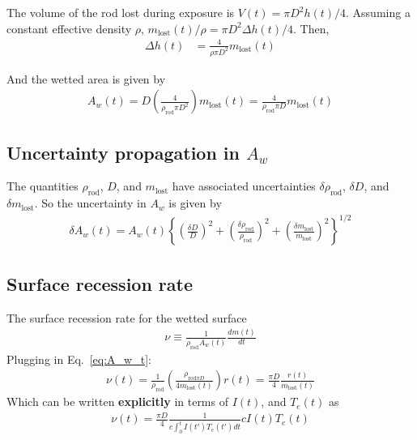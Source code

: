 \documentclass[11pt,twoside]{article}
\begin{document}
The volume of the rod lost during exposure is $V(t) = \pi D^2 h(t) / 4$. Assuming a constant effective density $\rho$, $m_{\mathrm{lost}}(t)/\rho = \pi D^2 \Delta h(t) / 4$. Then,
\begin{align*}
    \Delta h(t) &= \frac{4}{\rho\pi D^2} m_{\mathrm{lost}}(t)
\end{align*}

And the wetted area is given by
\begin{align}
    A_w(t) = D\left( \frac{4}{\rho_{\mathrm{rod}}\pi D^2}\right) m_{\mathrm{lost}}(t) 
    = \frac{4}{\rho_{\mathrm{rod}}\pi D} m_{\mathrm{lost}} (t) 
    \label{eq:A_w_t}
\end{align}

\subsection{Uncertainty propagation in $A_w$}
The quantities $\rho_{\mathrm{rod}}$, $D$, and $m_{\mathrm{lost}}$ have associated uncertainties $\delta \rho_{\mathrm{rod}}$, $\delta D$, and $\delta m_{\mathrm{lost}}$. So the uncertainty in $A_w$ is given by
\begin{align}
    \delta A_w (t) = A_w(t) \left\{ 
        \left(\frac{\delta D}{D}\right)^2 
        +
        \left(\frac{\delta \rho_{\mathrm{rod}}}{\rho_{\mathrm{rod}}}\right)^2 
        + 
        \left(\frac{\delta m_{\mathrm{lost}}}{m_{\mathrm{lost}}}\right)^2
    \right\}^{1/2}
\end{align}

\subsection{Surface recession rate}
The surface recession rate for the wetted surface 
\begin{align}
    \nu \equiv \frac{1}{\rho_{\mathrm{rod}} A_w(t)} \frac{dm(t)}{dt} 
\end{align}
Plugging in Eq.~\eqref{eq:A_w_t}:
\begin{align*}
    \nu(t) = \frac{1}{\rho_{\mathrm{rod}}} \left( \frac{\rho_{\mathrm{rod} \pi D}}{4 m_{\mathrm{lost}}(t)}\right) r(t)
    = \frac{\pi D}{4} \frac{r(t)}{m_{\mathrm{lost}}(t)}
\end{align*}
Which can be written \textbf{explicitly} in terms of $I(t)$, and $T_e(t)$ as
\begin{align}
    \nu(t) = \frac{\pi D}{4} \frac{1}{c \int_0^t I(t')T_e(t') dt} c I(t) T_e(t) 
    \label{eq:nu_explicitly}
\end{align}
\end{document}
